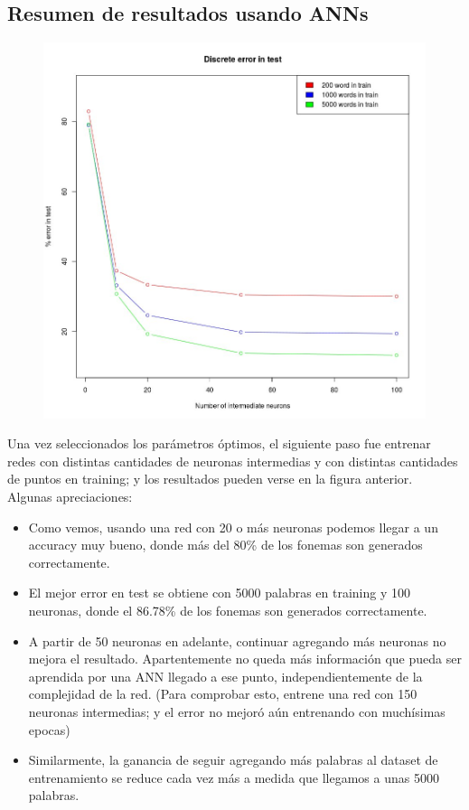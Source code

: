 \documentclass[paper=a4, fontsize=11pt]{scrartcl} %
\numberwithin{equation}{section} %
\numberwithin{figure}{section} %
\numberwithin{table}{section} %
\begin{document}
\subsection{Resumen de resultados usando ANNs}

\begin{figure}[h!]
\centering
\includegraphics[width=112mm]{annresults.jpg}
\end{figure}

Una vez seleccionados los parámetros óptimos, el siguiente paso fue entrenar redes con distintas cantidades de neuronas intermedias y con distintas cantidades de puntos en training; y los resultados pueden verse en la figura anterior. \\

Algunas apreciaciones:

\begin{itemize}
\item Como vemos, usando una red con 20 o más neuronas podemos llegar a un accuracy muy bueno, donde más del 80\% de los fonemas son generados correctamente.
\item El mejor error en test se obtiene con 5000 palabras en training y 100 neuronas, donde el 86.78\% de los fonemas son generados correctamente.
\item A partir de 50 neuronas en adelante, continuar agregando más neuronas no mejora el resultado. Apartentemente no queda más información que pueda ser aprendida por una ANN llegado a ese punto, independientemente de la complejidad de la red. (Para comprobar esto, entrene una red con 150 neuronas intermedias; y el error no mejoró aún entrenando con muchísimas epocas)
\item Similarmente, la ganancia de seguir agregando más palabras al dataset de entrenamiento se reduce cada vez más a medida que llegamos a unas 5000 palabras. 
\end{itemize}
\end{document}
